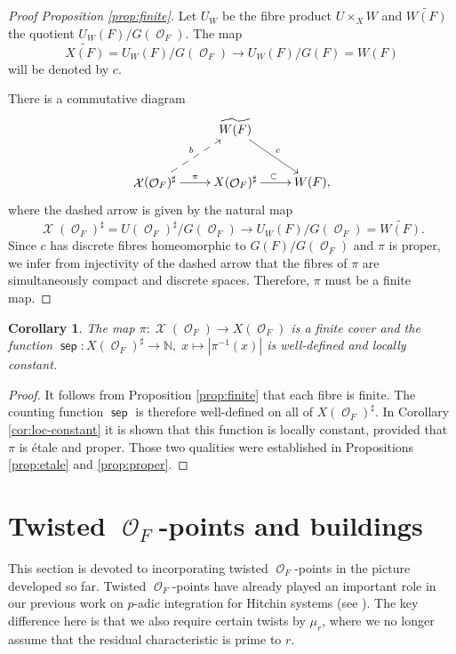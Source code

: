 \documentclass{article}
\DeclareMathOperator{\sep}{\mathsf{sep}}
\DeclareMathOperator{\Xc}{\mathcal{X}}
\DeclareMathOperator{\Oc}{\mathcal{O}}
\theoremstyle{definition}
\theoremstyle{plain}
\newtheorem{corollary}[definition]{Corollary}
\begin{document}
\begin{proof}[Proof Proposition \ref{prop:finite}]
Let $U_W$ be the fibre product $U \times_X W$ and $\widetilde{W(F)}$ the quotient $U_W(F)/G(\Oc_F)$. The map 
\begin{equation}\label{eqn:strassenzug}
\widetilde{X(F)}=U_W(F)/G(\Oc_F) \to U_W(F)/G(F)=W(F)\end{equation}
will be denoted by $c$.

There is a commutative diagram
\[
\xymatrix{
& \widetilde{W(F)} \ar[rd]^{c} & \\
\Xc(\Oc_F)^{\sharp} \ar[r]^{\pi} \ar@{-->}[ur]^b & X(\Oc_F)^{\sharp} \ar[r]^{\subset} & W(F),
}
\]
where the dashed arrow is given by the natural map 
$$\Xc(\Oc_F)^{\sharp}=U(\Oc_F)^{\sharp}/G(\Oc_F) \to U_W(F)/G(\Oc_F)=\widetilde{W(F)}.$$ 
Since $c$ has discrete fibres homeomorphic to $G(F)/G(\Oc_F)$ and $\pi$ is proper, we infer from injectivity of the dashed arrow that the fibres of $\pi$ are simultaneously compact and discrete spaces. Therefore, $\pi$ must be a finite map.
\end{proof}

\begin{corollary}
The map $\pi\colon \Xc(\Oc_F) \to X(\Oc_F)$ is a finite cover and the function $\sep\colon X(\Oc_F)^{\sharp} \to \mathbb{N},\; x \mapsto |\pi^{-1}(x)|$ is well-defined and locally constant.
\end{corollary}
\begin{proof}
It follows from Proposition \ref{prop:finite} that each fibre is finite. The counting function $\sep$ is therefore well-defined on all of $X(\Oc_F)^{\sharp}$. In Corollary \ref{cor:loc-constant} it is shown that this function is locally constant, provided that $\pi$ is \'etale and proper. Those two qualities were established in Propositions \ref{prop:etale} and \ref{prop:proper}.
\end{proof}








\section{Twisted $\Oc_F$-points and buildings}\label{tpb}

This section is devoted to incorporating twisted $\Oc_F$-points in the picture developed so far. Twisted $\Oc_F$-points have already played an important role in our previous work on $p$-adic integration for Hitchin systems (see \cite{GWZ20b,GWZ20a}). The key difference here is that we also require certain twists by $\mu_r$, where we no longer assume that the residual characteristic is prime to $r$.
\end{document}
